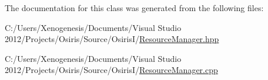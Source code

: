The documentation for this class was generated from the following files\-:\begin{DoxyCompactItemize}
\item 
C\-:/\-Users/\-Xenogenesis/\-Documents/\-Visual Studio 2012/\-Projects/\-Osiris/\-Source/\-Osiris\-I/\hyperlink{_resource_manager_8hpp}{Resource\-Manager.\-hpp}\item 
C\-:/\-Users/\-Xenogenesis/\-Documents/\-Visual Studio 2012/\-Projects/\-Osiris/\-Source/\-Osiris\-I/\hyperlink{_resource_manager_8cpp}{Resource\-Manager.\-cpp}\end{DoxyCompactItemize}
